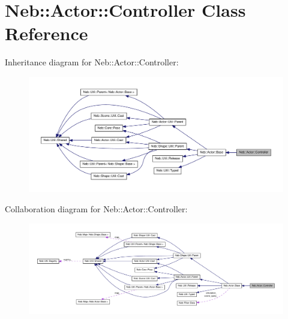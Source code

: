 \hypertarget{classNeb_1_1Actor_1_1Controller}{\section{\-Neb\-:\-:\-Actor\-:\-:\-Controller \-Class \-Reference}
\label{classNeb_1_1Actor_1_1Controller}
}


\-Inheritance diagram for \-Neb\-:\-:\-Actor\-:\-:\-Controller\-:\nopagebreak
\begin{figure}[H]
\begin{center}
\leavevmode
\includegraphics[width=350pt]{classNeb_1_1Actor_1_1Controller__inherit__graph}
\end{center}
\end{figure}


\-Collaboration diagram for \-Neb\-:\-:\-Actor\-:\-:\-Controller\-:\nopagebreak
\begin{figure}[H]
\begin{center}
\leavevmode
\includegraphics[width=350pt]{classNeb_1_1Actor_1_1Controller__coll__graph}
\end{center}
\end{figure}
